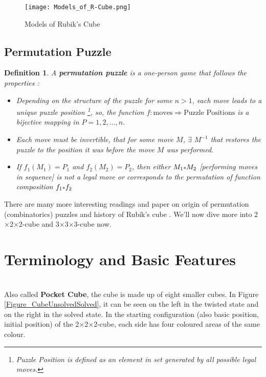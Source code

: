 \documentclass[12pt,a4paper]{article}
\theoremstyle{custom}
\newtheorem*{definition}{Definition}
\newcommand{\Ttwo}{2$\times$2$\times$2-}
\newcommand{\Tthree}{3$\times$3$\times$3-}
\begin{document}
\begin{figure}[h]
\centering
\texttt{[image: Models\_of\_R-Cube.png]}
\caption{Models of Rubik's Cube \cite{2018ChJME..31...77Z}}
\label{Figure_Mrubik's cube}
\end{figure}
\subsection*{Permutation Puzzle}
\label{PP}
\begin{definition}
    A \textbf{permutation puzzle} is a one-person game that follows the properties \cite{wong2010group} : 
    \begin{itemize}
        \item Depending on the structure of the puzzle for some $n>1$, each move leads to a unique puzzle position \footnote{Puzzle Position is defined as an element in set generated by all possible legal moves.}, so, the function $f: \text{moves} \Rightarrow \text{Puzzle Positions}$ is a bijective mapping in $P= 1,2,...,n$.
        \item Each move must be invertible, that for some move $M$, $\exists$ $M^{-1}$ that restores the puzzle to the position it was before the move $M$ was performed. 
        \item If $f_1(M_1)=P_1$ and $f_2(M_2)=P_2$, then either $M_1 \mathlarger{\scriptstyle*}M_2$ [performing moves in sequence] is not a legal move or corresponds to the permutation of function composition ${f_1} \mathlarger{\scriptstyle*}{f_2}$ 
        
    \end{itemize}
\end{definition}






There are many more interesting readings and paper on origin of permutation (combinatorics) puzzles \cite{BIGGS1979109} and history of Rubik's cube \cite{pekonen2021cubed}. We'll now dive more into \Ttwo cube and \Tthree cube now. 


\section{Terminology and Basic Features}
\fbox{\textbf{\Ttwo Cubes}} \\

Also called \textbf{Pocket Cube}, the cube is made up of eight smaller cubes.
In Figure \ref{Figure_CubeUnsolvedSolved}, it can be seen on the left in the twisted state and on the right in the solved state. 
In the starting configuration (also basic position, initial position) of the \Ttwo cube, each side has four coloured areas of the same colour.
\end{document}
